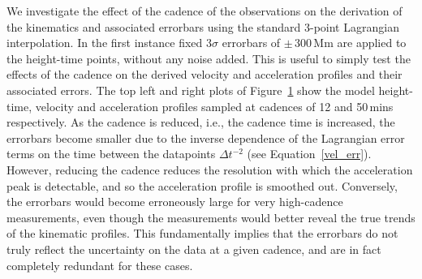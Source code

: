 \documentclass[structabstract]{aa}
\begin{document}
\begin{figure}[t]
\caption{}
\label{fig_cadence_hva}
\end{figure}

We investigate the effect of the cadence of the observations on the derivation of the kinematics and associated errorbars using the standard 3-point Lagrangian interpolation. In the first instance fixed 3$\sigma$ errorbars of $\pm$\,300\,Mm are applied to the height-time points, without any noise added. This is useful to simply test the effects of the cadence on the derived velocity and acceleration profiles and their associated errors. The top left and right plots of Figure~\ref{fig_cadence_hva} show the model height-time, velocity and acceleration profiles sampled at cadences of 12 and 50\,mins respectively. As the cadence is reduced, i.e., the cadence time is increased, the errorbars become smaller due to the inverse dependence of the Lagrangian error terms on the time between the datapoints $\Delta t^{-2}$ (see Equation~\ref{vel_err}). However, reducing the cadence reduces the resolution with which the acceleration peak is detectable, and so the acceleration profile is smoothed out. Conversely, the errorbars would become erroneously large for very high-cadence measurements, even though the measurements would better reveal the true trends of the kinematic profiles. This fundamentally implies that the errorbars do not truly reflect the uncertainty on the data at a given cadence, and are in fact completely redundant for these cases.


\end{document}
